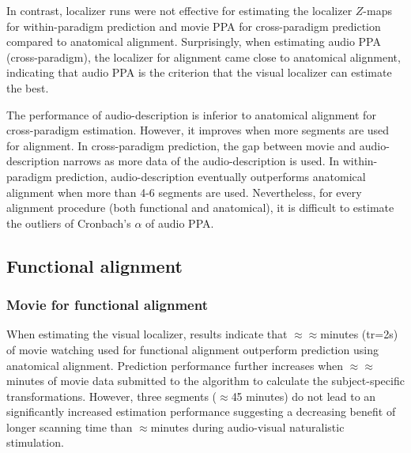 %
In contrast, localizer runs were not effective for estimating the localizer
$Z$-maps for within-paradigm prediction and movie PPA for cross-paradigm
prediction compared to anatomical alignment.
%
Surprisingly, when estimating audio PPA (cross-paradigm), the localizer for
alignment came close to anatomical alignment, indicating that audio PPA is the
criterion that the visual localizer can estimate the best.


The performance of audio-description is inferior to anatomical alignment for
cross-paradigm estimation.
%
However, it improves when more segments are used for alignment.
%
In cross-paradigm prediction, the gap between movie and audio-description
narrows as more data of the audio-description is used.
%
In within-paradigm prediction, audio-description eventually outperforms
anatomical alignment when more than 4-6 segments are used.
%
Nevertheless, for every alignment procedure (both functional and anatomical), it
is difficult to estimate the outliers of Cronbach's $\alpha$ of audio PPA.



\subsection{Functional alignment}




\subsubsection{Movie for functional alignment}



%
When estimating the visual localizer, results indicate that $\approx$$\approx$\unit[15]{min}utes
(\ac{tr}=2s) of movie watching used for functional alignment outperform
prediction using anatomical alignment.
%
Prediction performance further increases when $\approx$$\approx$\unit[30]{min}utes of movie data
submitted to the algorithm to calculate the subject-specific transformations.
%
However, three segments ($\approx$45 minutes) do not lead to an significantly
increased estimation performance suggesting a decreasing benefit of longer
scanning time than $\approx$\unit[30]{min}utes during audio-visual naturalistic stimulation.



